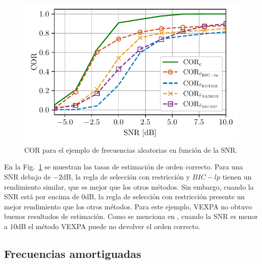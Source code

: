 \begin{figure}[t]
	\centering
	\includegraphics[width = 0.7\linewidth]{Figuras/COR_Example_random_frequencies_2.pdf}
	\caption{COR para el ejemplo de frecuencias aleatorias en función de la SNR.}
	\label{fig:COR_random}
\end{figure}
En la Fig.~\ref{fig:COR_random} se muestran las tasas de estimación de orden correcto. Para una SNR debajo de $-2$dB, la regla de selección con restricción y $BIC-lp$ tienen un rendimiento similar, que es mejor que los otros métodos. Sin embargo, cuando la SNR está por encima de $0$dB, la regla de selección con restricción presente un mejor rendimiento que los otros métodos. Para este ejemplo, VEXPA no obtuvo buenos resultados de estimación. Como se menciona en \cite{BRIANI2020}, cuando la SNR es menor a $10$dB el método VEXPA puede no devolver el orden correcto. 

\subsection{Frecuencias amortiguadas}

